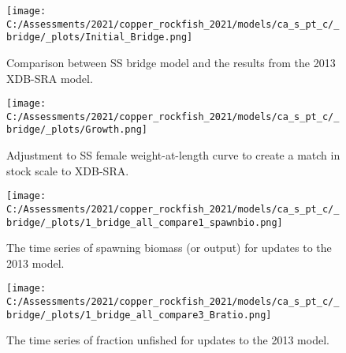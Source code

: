 \documentclass[11pt,
  english,
  a4paper,
]{article}
\begin{document}
\tagmcend\tagstructend


\begin{figure}
\centering
\texttt{[image: C:/Assessments/2021/copper\_rockfish\_2021/models/ca\_s\_pt\_c/\_bridge/\_plots/Initial\_Bridge.png]}
\caption{Comparison between SS bridge model and the results from the 2013 XDB-SRA model.\label{fig:bridge-1}}
\end{figure}

\tagmcend\tagstructend


\begin{figure}
\centering
\texttt{[image: C:/Assessments/2021/copper\_rockfish\_2021/models/ca\_s\_pt\_c/\_bridge/\_plots/Growth.png]}
\caption{Adjustment to SS female weight-at-length curve to create a match in stock scale to XDB-SRA.\label{fig:bridge-growth}}
\end{figure}

\tagmcend\tagstructend


\begin{figure}
\centering
\texttt{[image: C:/Assessments/2021/copper\_rockfish\_2021/models/ca\_s\_pt\_c/\_bridge/\_plots/1\_bridge\_all\_compare1\_spawnbio.png]}
\caption{The time series of spawning biomass (or output) for updates to the 2013 model.\label{fig:bridge-ssb}}
\end{figure}

\tagmcend\tagstructend


\begin{figure}
\centering
\texttt{[image: C:/Assessments/2021/copper\_rockfish\_2021/models/ca\_s\_pt\_c/\_bridge/\_plots/1\_bridge\_all\_compare3\_Bratio.png]}
\caption{The time series of fraction unfished for updates to the 2013 model.\label{fig:bridge-depl}}
\end{figure}
\end{document}
